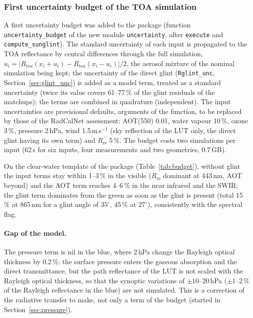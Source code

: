 \documentclass[11pt,a4paper]{article}
\newcommand{\Rrs}{R_\mathrm{rs}}
\newcommand{\code}[1]{\texttt{#1}}
\begin{document}
\subsubsection{First uncertainty budget of the TOA simulation}
\label{sec:budget}
A first uncertainty budget was added to the package (function \code{uncertainty\_budget} of the new module
\code{uncertainty}, after \code{execute} and \code{compute\_sunglint}). The standard uncertainty of each input is propagated to the TOA
reflectance by central differences through the full simulation, $u_i = |R_\mathrm{toa}(x_i+u_i) -
R_\mathrm{toa}(x_i-u_i)|/2$, the aerosol mixture of the nominal simulation being kept; the uncertainty of the direct
glint (\code{Rglint\_unc}, Section~\ref{sec:glint_unc}) is added as a model term, treated as a standard uncertainty
(twice its value covers 61--77\,\% of the glint residuals of the matchups); the terms are combined in quadrature
(independent). The input uncertainties are provisional defaults, arguments of the function, to be replaced by those
of the RadCalNet assessment: AOT(550) 0.01, water vapour 10\,\%, ozone 3\,\%, pressure 2\,hPa, wind 1.5\,m\,s$^{-1}$
(sky reflection of the LUT only, the direct glint having its own term) and $\Rrs$ 5\,\%. The budget costs two
simulations per input (62\,s for six inputs, four measurements and two geometries, 0.7\,GB).

On the clear-water template of the package (Table~\ref{tab:budget}), without glint the input terms stay within
1--3\,\% in the visible ($\Rrs$ dominant at 443\,nm, AOT beyond) and the AOT term reaches 4--6\,\% in the near infrared
and the SWIR; the glint term dominates from the green as soon as the glint is present (total 15\,\% at 865\,nm for a
glint angle of $35^\circ$, 45\,\% at $27^\circ$), consistently with the spectral flag.

\paragraph{Gap of the model.} The pressure term is nil in the blue, where 2\,hPa change the Rayleigh optical thickness
by 0.2\,\%: the surface pressure enters the gaseous absorption and the direct transmittance, but the path reflectance
of the LUT is not scaled with the Rayleigh optical thickness, so that the synoptic variations of $\pm10$--20\,hPa
($\pm1$--2\,\% of the Rayleigh reflectance in the blue) are not simulated. This is a correction of the radiative
transfer to make, not only a term of the budget (started in Section~\ref{sec:pressure}).
\end{document}

